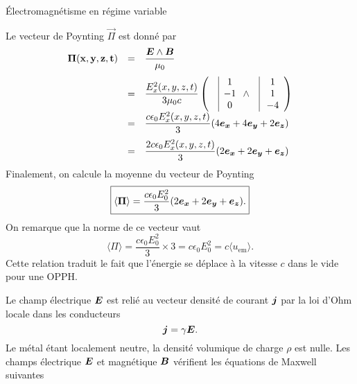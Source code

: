\begin{corr}{Électromagnétisme en régime variable}
\begin{corrlist}
	\item Le vecteur de Poynting $\vec{\Pi}$ est donné par 
	      \begin{equation*}
		      \begin{array}{rcl}
			      \vec{\Pi(x, y, z, t)} &=& \dfrac{\vece \wedge \vecb}
			      {\mu_0} \\[1.2em]
		      	      &=& \dfrac{E_x^2(x, y, z, t)}{3\mu_0c} \left(
			      \quad \vline
			      \begin{array}{c}
				      1 \\
				      - 1 \\
				      0
			      \end{array}
			      \wedge \quad
			      \vline
			      \begin{array}{c}
				      1 \\
				      1 \\
				      -4
			      \end{array}
		      \right) \\[1.2em] 
			&=& \dfrac{c \epsilon_0 E_x^2(x, y, z, t)}
			{3}(4\ex + 4\ey + 2\ez) \\[1em]
			&=& \dfrac{2 c \epsilon_0 E_x^2(x, y, z, t)}
			{3}(2\ex + 2\ey + \ez)
	      \end{array}
	      \end{equation*}
	      Finalement, on calcule la moyenne du vecteur de Poynting
	      \begin{equation*}
		      \boxed{
		      \langle \vec{\Pi} \rangle = 
		      \dfrac{c \epsilon_0 E_0^2}{3}(2\ex + 2\ey + \ez).
	      }
      	      \end{equation*}
	      On remarque que la norme de ce vecteur vaut
	      \begin{equation*}
		      \langle \Pi \rangle = \dfrac{c \epsilon_0 E_0^2}{3} \times 3
		      = c \epsilon_0 E_0^2 = c \langle u_\mathrm{em} \rangle.
	      \end{equation*}
	      Cette relation traduit le fait que l'énergie se déplace à la vitesse
	      $c$ dans le vide pour une OPPH.
\end{corrlist}


	\begin{corrlist}
		\item Le champ électrique $\vece$ est relié au vecteur densité de courant
		$\vecj$ par la loi d'Ohm locale dans les conducteurs
		\begin{equation*}
			\vecj = \gamma \vece.
		\end{equation*}
		Le métal étant localement neutre, la densité volumique de charge
		$\rho$ est nulle. Les champs électrique $\vece$ et magnétique $\vecb$
		vérifient les équations de Maxwell suivantes 


\end{corrlist}
\end{corr}
